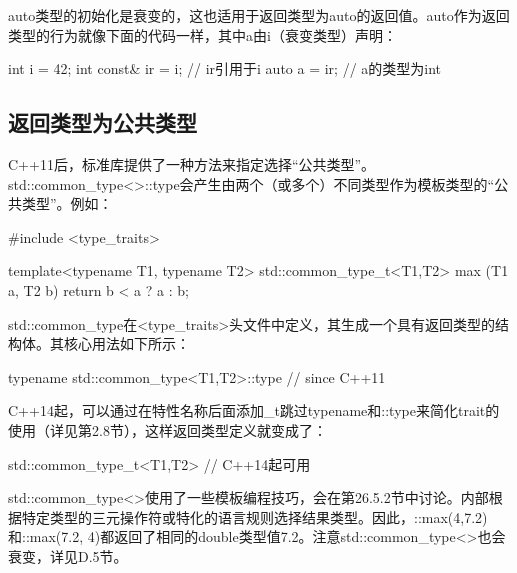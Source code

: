 auto类型的初始化是衰变的，这也适用于返回类型为auto的返回值。auto作为返回类型的行为就像下面的代码一样，其中a由i（衰变类型）声明：

\begin{cpp}
int i = 42;
int const& ir = i; // ir引用于i
auto a = ir; // a的类型为int
\end{cpp}

\subsection{返回类型为公共类型}

C++11后，标准库提供了一种方法来指定选择“公共类型”。std::common\_type<>::type会产生由两个（或多个）不同类型作为模板类型的“公共类型”。例如：

\begin{cpp}
#include <type_traits>

template<typename T1, typename T2>
std::common_type_t<T1,T2> max (T1 a, T2 b)
{
	return b < a ? a : b;
}
\end{cpp}

std::common\_type在<type\_traits>头文件中定义，其生成一个具有返回类型的结构体。其核心用法如下所示：

\begin{cpp}
typename std::common_type<T1,T2>::type // since C++11
\end{cpp}

C++14起，可以通过在特性名称后面添加\_t跳过typename和::type来简化trait的使用（详见第2.8节），这样返回类型定义就变成了：

\begin{cpp}
std::common_type_t<T1,T2> // C++14起可用
\end{cpp}

std::common\_type<>使用了一些模板编程技巧，会在第26.5.2节中讨论。内部根据特定类型的三元操作符或特化的语言规则选择结果类型。因此，::max(4,7.2)和::max(7.2, 4)都返回了相同的double类型值7.2。注意std::common\_type<>也会衰变，详见D.5节。




